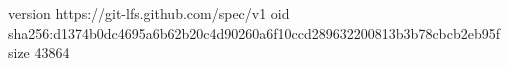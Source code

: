 version https://git-lfs.github.com/spec/v1
oid sha256:d1374b0dc4695a6b62b20c4d90260a6f10ccd289632200813b3b78cbcb2eb95f
size 43864
